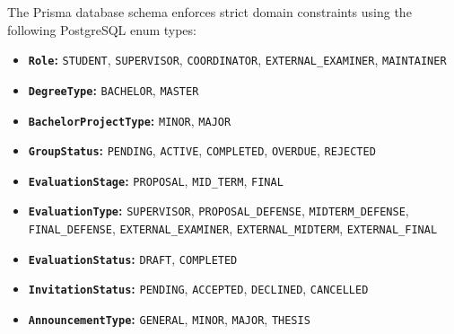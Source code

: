 The Prisma database schema enforces strict domain constraints using the following PostgreSQL enum types:

\begin{itemize}
  \item \textbf{\texttt{Role}:} \texttt{STUDENT}, \texttt{SUPERVISOR}, \texttt{COORDINATOR}, \texttt{EXTERNAL\_EXAMINER}, \texttt{MAINTAINER}
  \item \textbf{\texttt{DegreeType}:} \texttt{BACHELOR}, \texttt{MASTER}
  \item \textbf{\texttt{BachelorProjectType}:} \texttt{MINOR}, \texttt{MAJOR}
  \item \textbf{\texttt{GroupStatus}:} \texttt{PENDING}, \texttt{ACTIVE}, \texttt{COMPLETED}, \texttt{OVERDUE}, \texttt{REJECTED}
  \item \textbf{\texttt{EvaluationStage}:} \texttt{PROPOSAL}, \texttt{MID\_TERM}, \texttt{FINAL}
  \item \textbf{\texttt{EvaluationType}:} \texttt{SUPERVISOR}, \texttt{PROPOSAL\_DEFENSE}, \texttt{MIDTERM\_DEFENSE}, \texttt{FINAL\_DEFENSE}, \texttt{EXTERNAL\_EXAMINER}, \texttt{EXTERNAL\_MIDTERM}, \texttt{EXTERNAL\_FINAL}
  \item \textbf{\texttt{EvaluationStatus}:} \texttt{DRAFT}, \texttt{COMPLETED}
  \item \textbf{\texttt{InvitationStatus}:} \texttt{PENDING}, \texttt{ACCEPTED}, \texttt{DECLINED}, \texttt{CANCELLED}
  \item \textbf{\texttt{AnnouncementType}:} \texttt{GENERAL}, \texttt{MINOR}, \texttt{MAJOR}, \texttt{THESIS}
\end{itemize}
